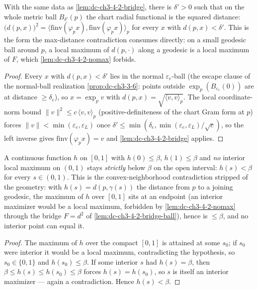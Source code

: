 \begin{lemma}
  \label{lem:dc-ch3-4-2-bridge-ball}


  With the same data as \cref{lem:dc-ch3-4-2-bridge}, there is $\delta'>0$ such that on the whole
  metric ball $B_{\delta'}(p)$ the chart radial functional is the squared distance:
  $\big(d(p,x)\big)^2 = \langle \mathrm{finv}(\varphi_p x), \mathrm{finv}(\varphi_p x)\rangle_p$ for
  every $x$ with $d(p,x)<\delta'$. This is the form the max-distance contradiction consumes
  directly: on a small geodesic ball around $p$, a local maximum of $d(p,\cdot)$ along a geodesic is
  a local maximum of $F$, which \cref{lem:dc-ch3-4-2-nomax} forbids.
\end{lemma}
\begin{proof}
  \sketch

  Every $x$ with $d(p,x)<\delta'$ lies in the normal $\varepsilon_e$-ball (the escape clause of the
  normal-ball realization \cref{prop:dc-ch3-3-6}: points outside $\exp_p(B_{\varepsilon_e}(0))$ are at
  distance $\ge\delta_e$), so $x=\exp_p v$ with $d(p,x)=\sqrt{\langle v,v\rangle_p}$. The local
  coordinate-norm bound $\|v\|^2\le c\,\langle v,v\rangle_p$ (positive-definiteness of the chart Gram
  form at $p$) forces $\|v\|<\min(\varepsilon_e,\varepsilon_L)$ once
  $\delta'\le\min(\delta_e,\min(\varepsilon_e,\varepsilon_L)/\sqrt c)$, so the left inverse gives
  $\mathrm{finv}(\varphi_p x)=v$ and \cref{lem:dc-ch3-4-2-bridge} applies.
\end{proof}

\begin{lemma}
  \label{lem:dc-ch3-4-2-maxdeduction}


  A continuous function $h$ on $[0,1]$ with $h(0)\le\beta$, $h(1)\le\beta$ and \emph{no} interior
  local maximum on $(0,1)$ stays \emph{strictly} below $\beta$ on the open interval: $h(s)<\beta$ for
  every $s\in(0,1)$. This is the convex-neighborhood contradiction stripped of the geometry:
  with $h(s)=d(p,\gamma(s))$ the distance from $p$ to a joining geodesic, the maximum of $h$ over
  $[0,1]$ sits at an endpoint (an interior maximizer would be a local maximum, forbidden by
  \cref{lem:dc-ch3-4-2-nomax} through the bridge $F=d^2$ of \cref{lem:dc-ch3-4-2-bridge-ball}), hence
  is $\le\beta$, and no interior point can equal it.
\end{lemma}
\begin{proof}
  \sketch

  The maximum of $h$ over the compact $[0,1]$ is attained at some $s_0$; if $s_0$ were interior it
  would be a local maximum, contradicting the hypothesis, so $s_0\in\{0,1\}$ and $h(s_0)\le\beta$.
  If some interior $s$ had $h(s)=\beta$, then $\beta\le h(s)\le h(s_0)\le\beta$ forces $h(s)=h(s_0)$,
  so $s$ is itself an interior maximizer — again a contradiction. Hence $h(s)<\beta$.
\end{proof}

